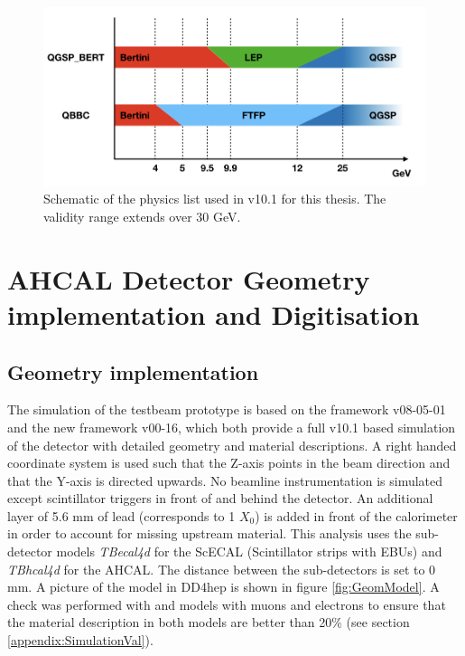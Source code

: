 \begin{figure}[htbp!]
  \centering
  \includegraphics[width=1\linewidth]{chap4/fig/PhysicsLists.jpeg}
  \caption{Schematic of the physics list used in \geant v10.1 for this thesis. The validity range extends over 30 GeV.} \label{fig:physics_list}
\end{figure}

\section{AHCAL Detector Geometry implementation and Digitisation}

\subsection{Geometry implementation}

The simulation of the testbeam prototype is based on the \mokka framework v08-05-01 and the new \ddhep framework v00-16, which both provide a full \geant v10.1 based simulation of the detector with detailed geometry and material descriptions. A right handed coordinate system is used such that the Z-axis points in the beam direction and that the Y-axis is directed upwards. No beamline instrumentation is simulated except scintillator triggers in front of and behind the detector. An additional layer of 5.6 mm of lead (corresponds to 1 $X_0$) is added in front of the calorimeter in order to account for missing upstream material. This analysis uses the sub-detector \mokka models \textit{TBecal4d} for the ScECAL (Scintillator strips with EBUs) and \textit{TBhcal4d} for the AHCAL. The distance between the sub-detectors is set to 0 mm. A picture of the model in DD4hep is shown in figure \ref{fig:GeomModel}. A check was performed with \mokka and \ddhep models with muons and electrons to ensure that the material description in both models are better than 20\% (see section \ref{appendix:SimulationVal}).\\

